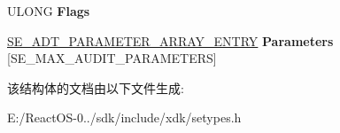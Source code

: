 \begin{DoxyCompactItemize}
U\+L\+O\+NG {\bfseries Flags}
\item 
\mbox{\label{struct___s_e___a_d_t___p_a_r_a_m_e_t_e_r___a_r_r_a_y_a65905d198476336b2c4b326f297a39fe}} 
\hyperlink{struct___s_e___a_d_t___p_a_r_a_m_e_t_e_r___a_r_r_a_y___e_n_t_r_y}{S\+E\+\_\+\+A\+D\+T\+\_\+\+P\+A\+R\+A\+M\+E\+T\+E\+R\+\_\+\+A\+R\+R\+A\+Y\+\_\+\+E\+N\+T\+RY} {\bfseries Parameters} \mbox{[}S\+E\+\_\+\+M\+A\+X\+\_\+\+A\+U\+D\+I\+T\+\_\+\+P\+A\+R\+A\+M\+E\+T\+E\+RS\mbox{]}
\end{DoxyCompactItemize}


该结构体的文档由以下文件生成\+:\begin{DoxyCompactItemize}
\item 
E\+:/\+React\+O\+S-\/0../sdk/include/xdk/setypes.\+h\end{DoxyCompactItemize}
